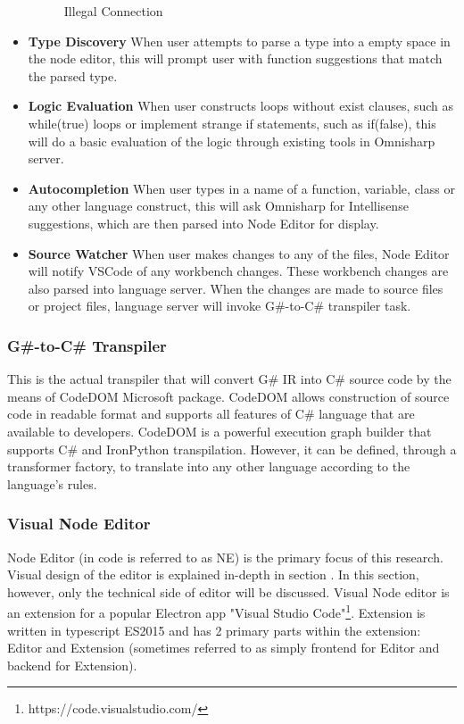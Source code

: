 \documentclass{article}
\begin{document}
\begin{itemize}
\begin{figure}[H]
              \caption{Illegal Connection}
              \label{fig:badconerror}
          \end{figure}
    \item \textbf{Type Discovery} \newline
          When user attempts to parse a type into a empty space in the node editor, this will prompt user with function suggestions that match the parsed type.
    \item \textbf{Logic Evaluation} \newline
          When user constructs loops without exist clauses, such as while(true) loops or implement strange if statements, such as if(false), this will do a basic evaluation of the logic through existing tools in Omnisharp server.
    \item \textbf{Autocompletion} \newline
          When user types in a name of a function, variable, class or any other language construct, this will ask Omnisharp for Intellisense suggestions, which are then parsed into Node Editor for display.
    \item \textbf{Source Watcher} \newline
          When user makes changes to any of the files, Node Editor will notify VSCode of any workbench changes. These workbench changes are also parsed into language server. When the changes are made to source files or project files, language server will invoke G\#-to-C\# transpiler task.
\end{itemize}
\subsubsection{G\#-to-C\# Transpiler}
This is the actual transpiler that will convert G\# IR into C\# source code by the means of CodeDOM Microsoft package. CodeDOM allows construction of source code in readable format and supports all features of C\# language that are available to developers. CodeDOM is a powerful execution graph builder that supports C\# and IronPython transpilation. However, it can be defined, through a transformer factory, to translate into any other language according to the language's rules.
\subsubsection{Visual Node Editor}
Node Editor (in code is referred to as NE) is the primary focus of this research. Visual design of the editor is explained in-depth in section . In this section, however, only the technical side of editor will be discussed.
Visual Node editor is an extension for a popular Electron app "Visual Studio Code"\footnote{https://code.visualstudio.com/}. Extension is written in typescript ES2015 and has 2 primary parts within the extension: Editor and Extension (sometimes referred to as simply frontend for Editor and backend for Extension).
\end{document}
